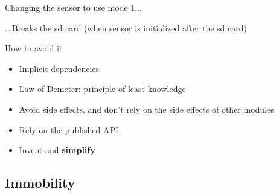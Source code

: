 \documentclass[xcolor=svgnames]{beamer}
\begin{document}
{%
%
\begin{frame}{\subsecname}
    \begin{minipage}{\columnwidth}
    \end{minipage}
\end{frame}
}


{%
%
\begin{frame}{\subsecname}
    Changing the sensor to use mode 1...
    \begin{minipage}{\columnwidth}
    \end{minipage}
    ...Breaks the sd card (when sensor is initialized after the sd card)
\end{frame}
}


{%
%
\begin{frame}{\subsecname}

    How to avoid it
    \begin{itemize}
        \pause \item Implicit dependencies
        \pause \item Law of Demeter: principle of least knowledge
        \pause \item Avoid side effects, and don't rely on the side effects of
            other modules
        \pause \item Rely on the published API
        \pause \item Invent and \textbf{simplify}
    \end{itemize}
\end{frame}
}


\subsection{Immobility}
\end{document}
